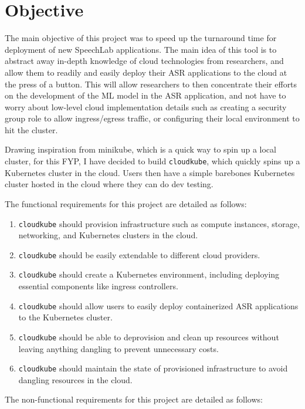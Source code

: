 \section{Objective}
The main objective of this project was to speed up the turnaround time for deployment of new SpeechLab applications. The main idea of this tool is to abstract away in-depth knowledge of cloud technologies from researchers, and allow them to readily and easily deploy their ASR applications to the cloud at the press of a button. This will allow researchers to then concentrate their efforts on the development of the ML model in the ASR application, and not have to worry about low-level cloud implementation details such as creating a security group role to allow ingress/egress traffic, or configuring their local environment to hit the cluster.  

Drawing inspiration from minikube, which is a quick way to spin up a local cluster, for this FYP, I have decided to build \texttt{cloudkube}, which quickly spins up a Kubernetes cluster in the  cloud. Users then have a simple barebones Kubernetes cluster hosted in the cloud where they can do dev testing. 

The functional requirements for this project are detailed as follows:
\vspace{-1em} %
\begin{enumerate}[label=\alph*., itemsep=0pt]
    \item \texttt{cloudkube} should provision infrastructure such as compute instances, storage, networking, and Kubernetes clusters in the cloud.
    \item \texttt{cloudkube} should be easily extendable to different cloud providers.
    \item \texttt{cloudkube} should create a Kubernetes environment, including deploying essential components like ingress controllers.
    \item \texttt{cloudkube} should allow users to easily deploy containerized ASR applications to the Kubernetes cluster.
    \item \texttt{cloudkube} should be able to deprovision and clean up resources without leaving anything dangling to prevent unnecessary costs.
    \item \texttt{cloudkube} should maintain the state of provisioned infrastructure to avoid dangling resources in the cloud.
\end{enumerate}
The non-functional requirements for this project are detailed as follows:
\vspace{-1em} %

